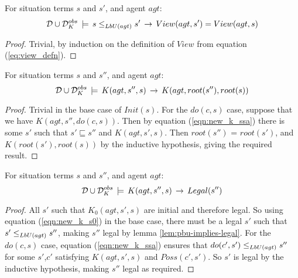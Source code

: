 \begin{lemma}
\label{lem:pbu-implies-view}For situation terms $s$ and $s'$, and
agent $agt$:\[
\mathcal{D}\cup\mathcal{D}_{K}^{obs}\,\models\, s\leq_{LbU(agt)}s'\,\rightarrow\, View(agt,s')=View(agt,s)\]

\end{lemma}
\begin{proof}
Trivial, by induction on the definition of $View$ from equation (\ref{eq:view_defn}). 
\end{proof}
\medskip{}


\begin{lemma}
\label{lem:K-implies-root}For situation terms $s$ and $s''$, and
agent $agt$:\[
\mathcal{D}\cup\mathcal{D}_{K}^{obs}\,\models\, K(agt,s'',s)\,\rightarrow\, K(agt,root(s''),root(s))\]

\end{lemma}
\begin{proof}
Trivial in the base case of $Init(s)$. For the $do(c,s)$ case, suppose
that we have $K(agt,s'',do(c,s))$. Then by equation (\ref{eqn:new_k_ssa})
there is some $s'$ such that $s'\sqsubseteq s''$ and $K(agt,s',s)$.
Then $root(s'')$ = $root(s')$, and $K(root(s'),root(s))$ by the
inductive hypothesis, giving the required result. 
\end{proof}
\medskip{}


\begin{lemma}
\label{lem:K-implies-legal}For situation terms $s$ and $s''$, and
agent $agt$:\[
\mathcal{D}\cup\mathcal{D}_{K}^{obs}\,\models\, K(agt,s'',s)\,\rightarrow\, Legal(s'')\]

\end{lemma}
\begin{proof}
All $s'$ such that $K_{0}(agt,s',s)$ are initial and therefore legal.
So using equation (\ref{eqn:new_k_s0}) in the base case, there must
be a legal $s'$ such that $s'\leq_{LbU(agt)}s''$, making $s''$
legal by lemma \ref{lem:pbu-implies-legal}. For the $do(c,s)$ case,
equation (\ref{eqn:new_k_ssa}) ensures that $do(c',s')\leq_{LbU(agt)}s''$
for some $s'$,$c'$ satisfying $K(agt,s',s)$ and $Poss(c',s')$.
So $s'$ is legal by the inductive hypothesis, making $s''$ legal
as required. 
\end{proof}
\medskip{}



